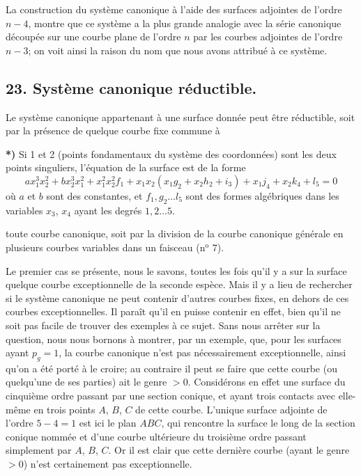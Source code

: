 \documentclass{article}
\begin{document}
La construction du système canonique à l'aide des surfaces adjointes de l'ordre $n-4$, montre que ce système a la plus grande analogie avec la série canonique découpée sur une courbe plane de l'ordre $n$ par les courbes adjointes de l'ordre $n-3$; on voit ainsi la raison du nom que nous avons attribué à ce système.

\subsection*{23. Système canonique réductible.}

Le système canonique appartenant à une surface donnée peut être réductible, soit par la présence de quelque courbe fixe commune à

\textbf{*)} Si 1 et 2 (points fondamentaux du système des coordonnées) sont les deux points singuliers, l'équation de la surface est de la forme
\[
a x_{1}^{3} x_{2}^{2} + b x_{2}^{3} x_{1}^{2} + x_{1}^{2} x_{2}^{2} f_{1} + x_{1} x_{2} (x_{1} g_{2} + x_{2} h_{2} + i_{3}) + x_{1} j_{4} + x_{2} k_{4} + l_{5} = 0
\]
où $a$ et $b$ sont des constantes, et $f_{1}, g_{2} \ldots l_{5}$ sont des formes algébriques dans les variables $x_{3}$, $x_{4}$ ayant les degrés $1, 2 \ldots 5$.

toute courbe canonique, soit par la division de la courbe canonique générale en plusieurs courbes variables dans un faisceau (n${}^{\text{o}}$ 7).

Le premier cas se présente, nous le savons, toutes les fois qu'il y a sur la surface quelque courbe exceptionnelle de la seconde espèce. Mais il y a lieu de rechercher si le système canonique ne peut contenir d'autres courbes fixes, en dehors de ces courbes exceptionnelles. Il paraît qu'il en puisse contenir en effet, bien qu'il ne soit pas facile de trouver des exemples à ce sujet. Sans nous arrêter sur la question, nous nous bornons à montrer, par un exemple, que, pour les surfaces ayant $p_{g} = 1$, la courbe canonique n'est pas nécessairement exceptionnelle, ainsi qu'on a été porté à le croire; au contraire il peut se faire que cette courbe (ou quelqu'une de ses parties) ait le genre $> 0$. Considérons en effet une surface du cinquième ordre passant par une section conique, et ayant trois contacts avec elle-même en trois points $A$, $B$, $C$ de cette courbe. L'unique surface adjointe de l'ordre $5-4=1$ est ici le plan $ABC$, qui rencontre la surface le long de la section conique nommée et d'une courbe ultérieure du troisième ordre passant simplement par $A$, $B$, $C$. Or il est clair que cette dernière courbe (ayant le genre $> 0$) n'est certainement pas exceptionnelle.
\end{document}
